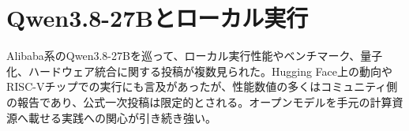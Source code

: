 \section{Qwen3.8-27Bとローカル実行}
Alibaba系のQwen3.8-27Bを巡って、ローカル実行性能やベンチマーク、量子化、ハードウェア統合に関する投稿が複数見られた。Hugging Face上の動向やRISC-Vチップでの実行にも言及があったが、性能数値の多くはコミュニティ側の報告であり、公式一次投稿は限定的とされる。オープンモデルを手元の計算資源へ載せる実践への関心が引き続き強い。
